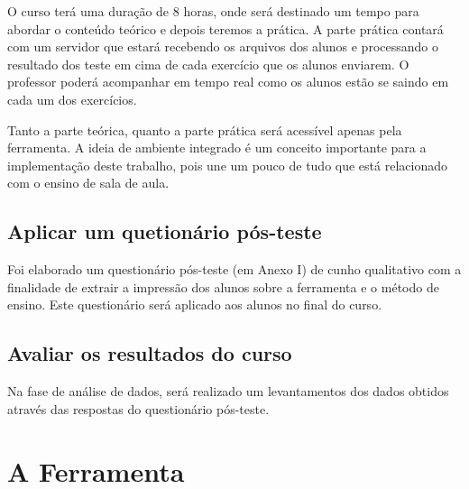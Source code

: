 \documentclass[pnumabnt,normaltoc,espacoumemeio,capchap]{abnt}
\begin{document}
\par O curso terá uma duração de 8 horas, onde será destinado um tempo para abordar o conteúdo teórico e depois teremos a prática. A parte prática contará com um servidor que estará recebendo os arquivos dos alunos e processando o resultado dos teste em cima de cada exercício que os alunos enviarem. O professor poderá acompanhar em tempo real como os alunos estão se saindo em cada um dos exercícios.

\par Tanto a parte teórica, quanto a parte prática será acessível apenas pela ferramenta. A ideia de ambiente integrado é um conceito importante para a implementação deste trabalho, pois une um pouco de tudo que está relacionado com o ensino de sala de aula.
\section{Aplicar um quetionário pós-teste}
\par Foi elaborado um questionário pós-teste (em Anexo I) de cunho qualitativo com a finalidade de extrair a impressão dos alunos sobre a ferramenta e o método de ensino. Este questionário será aplicado aos alunos no final do curso.
\section{Avaliar os resultados do curso}
\par Na fase de análise de dados, será realizado um levantamentos dos dados obtidos através das respostas do questionário pós-teste. 

\chapter{A Ferramenta}
\end{document}
